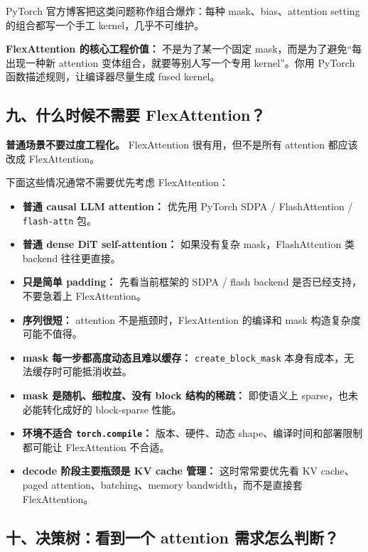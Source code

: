 PyTorch 官方博客把这类问题称作组合爆炸：每种 mask、bias、attention setting 的组合都写一个手工 kernel，几乎不可维护。

\begin{summarybox}
\textbf{FlexAttention 的核心工程价值：} 不是为了某一个固定 mask，而是为了避免“每出现一种新 attention 变体组合，就要等别人写一个专用 kernel”。你用 PyTorch 函数描述规则，让编译器尽量生成 fused kernel。
\end{summarybox}

\subsection{九、什么时候不需要 FlexAttention？}

\begin{warnbox}
\textbf{普通场景不要过度工程化。} FlexAttention 很有用，但不是所有 attention 都应该改成 FlexAttention。
\end{warnbox}

下面这些情况通常不需要优先考虑 FlexAttention：

\begin{itemize}[leftmargin=1.5em]
  \item \textbf{普通 causal LLM attention：} 优先用 PyTorch SDPA / FlashAttention / \texttt{flash-attn} 包。
  \item \textbf{普通 dense DiT self-attention：} 如果没有复杂 mask，FlashAttention 类 backend 往往更直接。
  \item \textbf{只是简单 padding：} 先看当前框架的 SDPA / flash backend 是否已经支持，不要急着上 FlexAttention。
  \item \textbf{序列很短：} attention 不是瓶颈时，FlexAttention 的编译和 mask 构造复杂度可能不值得。
  \item \textbf{mask 每一步都高度动态且难以缓存：} \texttt{create\_block\_mask} 本身有成本，无法缓存时可能抵消收益。
  \item \textbf{mask 是随机、细粒度、没有 block 结构的稀疏：} 即使语义上 sparse，也未必能转化成好的 block-sparse 性能。
  \item \textbf{环境不适合 \texttt{torch.compile}：} 版本、硬件、动态 shape、编译时间和部署限制都可能让 FlexAttention 不合适。
  \item \textbf{decode 阶段主要瓶颈是 KV cache 管理：} 这时常常要优先看 KV cache、paged attention、batching、memory bandwidth，而不是直接套 FlexAttention。
\end{itemize}

\subsection{十、决策树：看到一个 attention 需求怎么判断？}


